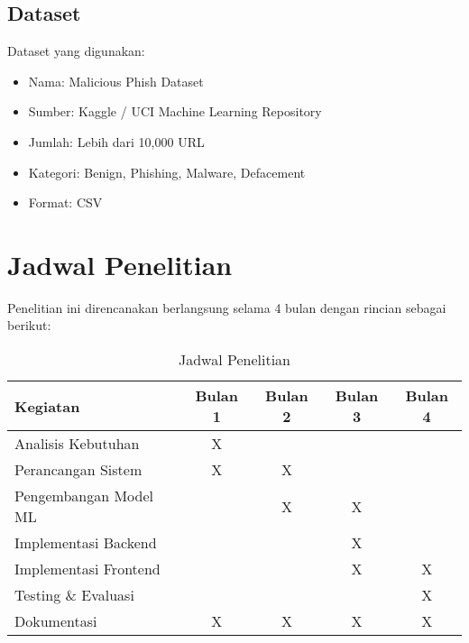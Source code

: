 \subsection{Dataset}

Dataset yang digunakan:
\begin{itemize}
    \item Nama: Malicious Phish Dataset
    \item Sumber: Kaggle / UCI Machine Learning Repository
    \item Jumlah: Lebih dari 10,000 URL
    \item Kategori: Benign, Phishing, Malware, Defacement
    \item Format: CSV
\end{itemize}

\section{Jadwal Penelitian}

Penelitian ini direncanakan berlangsung selama 4 bulan dengan rincian sebagai berikut:

\begin{table}[h]
\centering
\caption{Jadwal Penelitian}
\label{tab:jadwal}
\begin{tabular}{|l|c|c|c|c|}
\hline
\textbf{Kegiatan} & \textbf{Bulan 1} & \textbf{Bulan 2} & \textbf{Bulan 3} & \textbf{Bulan 4} \\
\hline
Analisis Kebutuhan & X & & & \\
\hline
Perancangan Sistem & X & X & & \\
\hline
Pengembangan Model ML & & X & X & \\
\hline
Implementasi Backend & & & X & \\
\hline
Implementasi Frontend & & & X & X \\
\hline
Testing \& Evaluasi & & & & X \\
\hline
Dokumentasi & X & X & X & X \\
\hline
\end{tabular}
\end{table}
